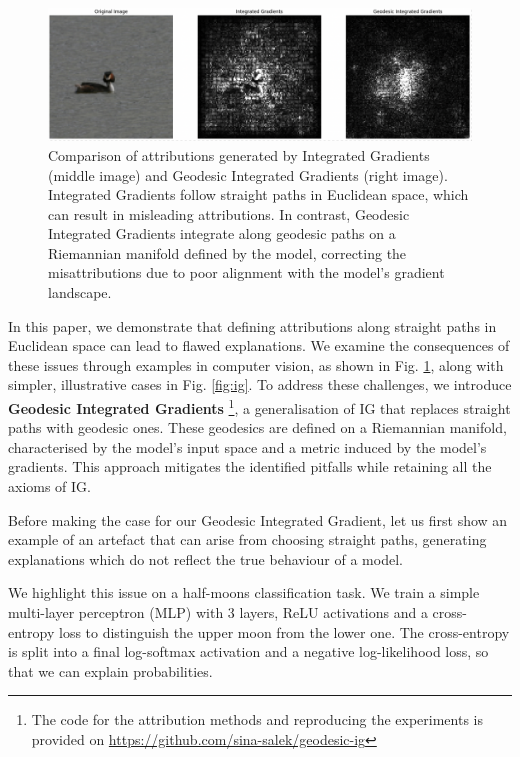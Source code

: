 \begin{figure}[t!]
	\begin{center}
		\centerline{\includegraphics[width=0.95\columnwidth]{figures/voc_compare.png}}
		\caption{Comparison of attributions generated by Integrated Gradients (middle image) and Geodesic Integrated Gradients (right image). Integrated Gradients follow straight paths in Euclidean space, which can result in misleading attributions. In contrast, Geodesic Integrated Gradients integrate along geodesic paths on a Riemannian manifold defined by the model, correcting the misattributions due to poor alignment with the model's gradient landscape.}
		\label{fig:duck}
	\end{center}
	\vskip -0.3in
\end{figure}

In this paper, we demonstrate that defining attributions along straight paths in Euclidean space can lead to flawed explanations. We examine the consequences of these issues through examples in computer vision, as shown in Fig. \ref{fig:duck}, along with simpler, illustrative cases in Fig. \ref{fig:ig}. To address these challenges, we introduce \textbf{Geodesic Integrated Gradients} \footnote{The code for the attribution methods and reproducing the experiments is provided on \href{https://github.com/sina-salek/geodesic-ig}{https://github.com/sina-salek/geodesic-ig}}, a generalisation of IG that replaces straight paths with geodesic ones. These geodesics are defined on a Riemannian manifold, characterised by the model's input space and a metric induced by the model's gradients. This approach mitigates the identified pitfalls while retaining all the axioms of IG.

Before making the case for our Geodesic Integrated Gradient, let us first show an example of an artefact that can arise from choosing straight paths, generating explanations which do not reflect the true behaviour of a model. 

We highlight this issue on a half-moons classification task. We train a simple multi-layer perceptron (MLP) with 3 layers, ReLU activations and a cross-entropy loss to distinguish the upper moon from the lower one. The cross-entropy is split into a final log-softmax activation and a negative log-likelihood loss, so that we can explain probabilities.

